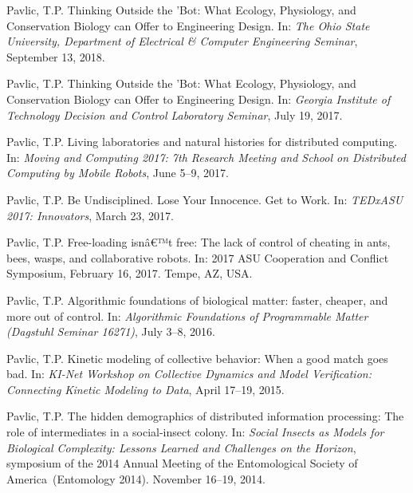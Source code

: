 \documentclass[10pt]{article}
\begin{document}
\begin{bibenum}
    \item Pavlic, T.P. Thinking Outside the 'Bot: What Ecology,
        Physiology, and Conservation Biology can Offer to Engineering
        Design. In: \emph{The Ohio State University, Department of
        Electrical \& Computer Engineering Seminar}, September 13, 2018.

    \item Pavlic, T.P. Thinking Outside the 'Bot: What Ecology,
        Physiology, and Conservation Biology can Offer to Engineering
        Design. In: \emph{Georgia Institute of Technology Decision and
        Control Laboratory Seminar}, July 19, 2017.

    \item Pavlic, T.P. Living laboratories and natural histories for
        distributed computing. In: \emph{Moving and Computing 2017: 7th
        Research Meeting and School on Distributed Computing by
        Mobile Robots}, June 5--9, 2017.

    \item Pavlic, T.P. Be Undisciplined. Lose Your Innocence. Get to
        Work. In: \emph{TEDxASU 2017: Innovators}, March 23, 2017.

    \item Pavlic, T.P. Free-loading isnâ€™t free: The lack of
        control of cheating in ants, bees, wasps, and collaborative
        robots. In: 2017 ASU Cooperation and Conflict Symposium,
        February 16, 2017. Tempe, AZ, USA.

    \item Pavlic, T.P. Algorithmic foundations of biological matter:
        faster, cheaper, and more out of control. In: \emph{Algorithmic
        Foundations of Programmable Matter (Dagstuhl Seminar 16271)},
        July 3--8, 2016.

    \item Pavlic, T.P. Kinetic modeling of collective behavior: When a
        good match goes bad. In: \emph{KI-Net Workshop on Collective
        Dynamics and Model Verification: Connecting Kinetic Modeling to
        Data}, April 17--19, 2015.

    \item Pavlic, T.P.
        The hidden demographics of distributed information processing:
        The role of intermediates in a social-insect colony. In:
        \emph{Social Insects as Models for Biological Complexity:
        Lessons Learned and Challenges on the Horizon}, symposium of the
        2014 Annual Meeting of the Entomological Society of
        America~(Entomology 2014). November 16--19, 2014.


\end{bibenum}
\end{document}
